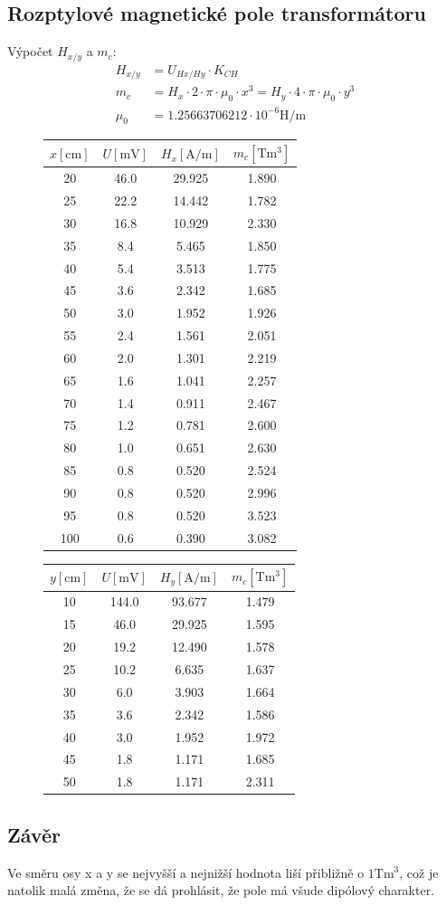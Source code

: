 \documentclass{article}
\begin{document}
\subsection{Rozptylové magnetické pole transformátoru}
Výpočet $H_{x/y}$ a $m_c$:
$$
\begin{aligned}
	H_{x/y} &= U_{Hx/Hy} \cdot K_{CH}\\
	m_c &= H_x \cdot 2 \cdot \pi \cdot \mu_0 \cdot x^3 = H_y \cdot 4 \cdot \pi \cdot \mu_0 \cdot y^3\\
	\mu_0 &= 1.25663706212 \cdot 10^{-6} \si{\henry\per\meter}
\end{aligned}
$$
\begin{figure}[H]
	\centering
		\begin{tabular}{c|c||c|c}
			$x [\si{\centi\meter}]$ & $U [\si{\milli\volt}]$ & $H_x [\si{\ampere\per\meter}]$ & $m_c [\si{\tesla\meter\cubed}]$ \\\hline \hline
			20 &46.0 &29.925 &1.890 \\\hline
			25 &22.2 &14.442 &1.782 \\\hline
			30 &16.8 &10.929 &2.330 \\\hline
			35 &8.4 &5.465 &1.850 \\\hline
			40 &5.4 &3.513 &1.775 \\\hline
			45 &3.6 &2.342 &1.685 \\\hline
			50 &3.0 &1.952 &1.926 \\\hline
			55 &2.4 &1.561 &2.051 \\\hline
			60 &2.0 &1.301 &2.219 \\\hline
			65 &1.6 &1.041 &2.257 \\\hline
			70 &1.4 &0.911 &2.467 \\\hline
			75 &1.2 &0.781 &2.600 \\\hline
			80 &1.0 &0.651 &2.630 \\\hline
			85 &0.8 &0.520 &2.524 \\\hline
			90 &0.8 &0.520 &2.996 \\\hline
			95 &0.8 &0.520 &3.523 \\\hline
			100 &0.6 &0.390 &3.082
		\end{tabular}
	\end{figure}
\begin{figure}[H]
	\centering
		\begin{tabular}{c|c||c|c}
			$y [\si{\centi\meter}]$ & $U [\si{\milli\volt}]$ & $H_y [\si{\ampere\per\meter}]$ & $m_c [\si{\tesla\meter\cubed}]$ \\\hline \hline
			10 &144.0 &93.677 &1.479 \\\hline
			15 &46.0 &29.925 &1.595 \\\hline
			20 &19.2 &12.490 &1.578 \\\hline
			25 &10.2 &6.635 &1.637 \\\hline
			30 &6.0 &3.903 &1.664 \\\hline
			35 &3.6 &2.342 &1.586 \\\hline
			40 &3.0 &1.952 &1.972 \\\hline
			45 &1.8 &1.171 &1.685 \\\hline
			50 &1.8 &1.171 &2.311
		\end{tabular}
\end{figure}
\subsection{Závěr}
Ve směru osy x a y se nejvyšší a nejnižší hodnota liší přibližně o $1 \si{\tesla\meter\cubed}$, což je natolik malá změna, že se dá prohlásit, že pole má všude dipólový charakter.
\end{document}
